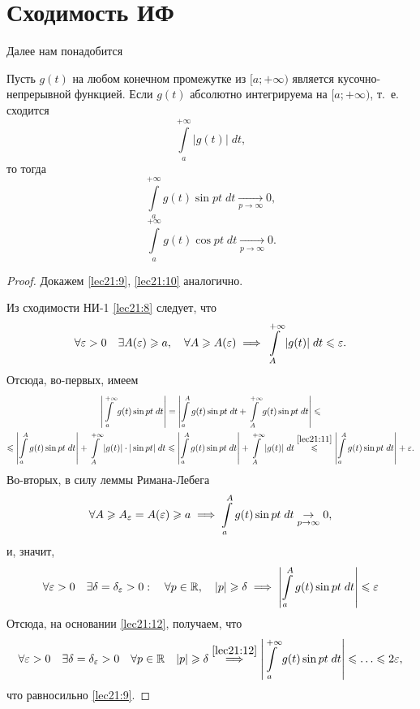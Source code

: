 \documentclass[../../main.tex]{subfiles}
\begin{document}
\section{Сходимость ИФ}

Далее нам понадобится
\begin{thm}
	Пусть $ g(t) $ на любом конечном промежутке из $ [a; +\infty) $
	является кусочно-непрерывной функцией. Если $ g(t) $ 
	абсолютно интегрируема на $ [a; +\infty) $, т.~е.
	сходится 
	\begin{equation}
	\label{lec21:8}
	\int\limits_{a}^{+\infty} |g(t)|\;dt,
	\end{equation} то тогда
	\begin{equation}
	\label{lec21:9}
	\int\limits_{a}^{+\infty} g(t) \sin pt\;dt
	\underset{p \to \infty}{\to} 0,
	\end{equation}
	\begin{equation}
	\label{lec21:10}
	\int\limits_{a}^{+\infty} g(t) \cos pt\;dt
	\underset{p \to \infty}{\to} 0.
	\end{equation}
\end{thm}
\begin{proof}
	Докажем \eqref{lec21:9}, \eqref{lec21:10} аналогично.
	
	Из сходимости НИ-1 \eqref{lec21:8} следует, что
	\begin{equation}
	\label{lec21:11}
	\forall \varepsilon > 0 \quad \exists A(\varepsilon) \geqslant a, \quad
	\forall A \geqslant A(\varepsilon) \implies 
	\int\limits_{A}^{+\infty} |g(t)|\;dt \leqslant \varepsilon.
	\end{equation}
	Отсюда, во-первых, имеем
	\begin{equation}
	\label{lec21:12}
	\begin{gathered}
	\left|  
	\int\limits_{a}^{+\infty} g(t) \sin pt\;dt
	\right| = \left|
	\int\limits_{a}^{A} g(t) \sin pt\;dt +
	\int\limits_{A}^{+\infty} g(t) \sin pt\;dt
	\right| \leqslant \\
	\leqslant \left|
	\int\limits_{a}^{A} g(t) \sin pt\;dt
	\right| +
	\int\limits_{A}^{+\infty} |g(t)|\cdot|\sin pt|\;dt \leqslant
	\left|
	\int\limits_{a}^{A} g(t) \sin pt\;dt
	\right| +
	\int\limits_{A}^{+\infty} |g(t)|\;dt \stackrel{\eqref{lec21:11}}{\leqslant}
	\left|
	\int\limits_{a}^{A} g(t) \sin pt\;dt
	\right| + \varepsilon.
	\end{gathered}
	\end{equation}
	Во-вторых, в силу леммы Римана-Лебега 
	\[
	\forall A \geqslant A_\varepsilon = A(\varepsilon) \geqslant a \implies
	\int\limits_{a}^{A} g(t) \sin pt\;dt \underset{p \to \infty}{\to} 0,
	\]
	и, значит,
	\[
	\forall \varepsilon > 0 \quad \exists \delta = \delta_\varepsilon > 0:\quad
	\forall p \in \mathbb{R},\quad |p| \geqslant \delta \implies
	\left|
	\int\limits_{a}^{A} g(t) \sin pt\;dt
	\right| \leqslant \varepsilon
	\]
	Отсюда, на основании \eqref{lec21:12}, получаем, что
	\[
	\forall \eps > 0 \quad \exists \delta = \delta_\eps > 0 \quad 
	\forall p \in \R \quad |p| \geq \delta
	\stackrel{\eqref{lec21:12}}{\implies}
	\left|
	\int\limits_{a}^{+\infty} g(t) \sin pt\;dt
	\right| \leq \dots \leq 2\eps,
	\] что равносильно \eqref{lec21:9}.
\end{proof}
\end{document}
